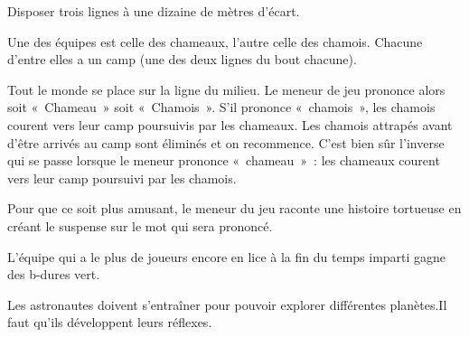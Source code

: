 \documentclass{grand-jeu}
\begin{document}
\begin{liste-materiel}
\end{liste-materiel}

\begin{regles}
Disposer trois lignes à une dizaine de mètres d'écart. 

Une des équipes est celle des chameaux, l’autre celle des chamois. Chacune d’entre elles a un camp (une des deux lignes du bout chacune).

Tout le monde se place sur la ligne du milieu. Le meneur de jeu prononce alors soit « Chameau » soit « Chamois ». S’il prononce « chamois », les chamois courent vers leur camp poursuivis par les chameaux. Les chamois attrapés avant d’être arrivés au camp sont éliminés et on recommence. C’est bien sûr l’inverse qui se passe lorsque le meneur prononce « chameau » : les chameaux courent vers leur camp poursuivi par les chamois.

Pour que ce soit plus amusant, le meneur du jeu raconte une histoire tortueuse en créant le suspense sur le mot qui sera prononcé. 

L'équipe qui a le plus de joueurs encore en lice à la fin du temps imparti gagne des b-dures vert.
\end{regles}

\begin{imaginaire}
Les astronautes doivent s'entraîner pour pouvoir explorer différentes planètes.Il faut qu'ils développent leurs réflexes. 
\end{imaginaire}

\begin{moments-stop}
\end{moments-stop}
\end{document}
